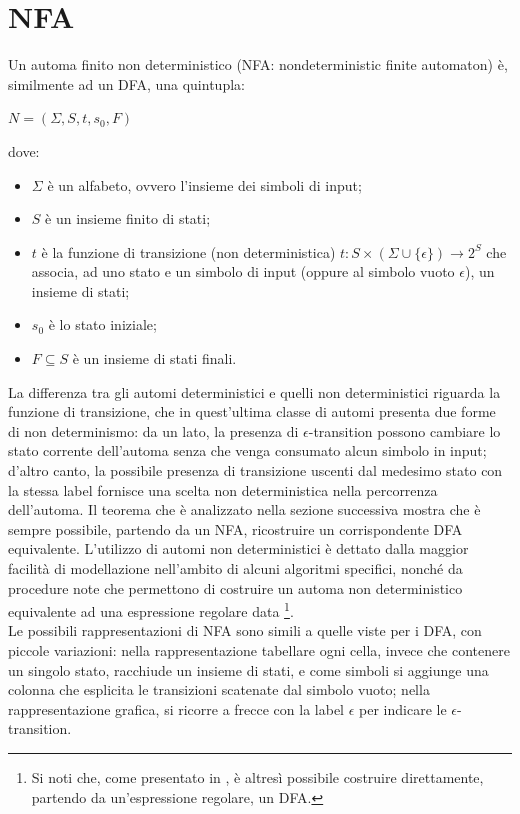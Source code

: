 \section{NFA}
Un automa finito non deterministico (NFA: nondeterministic finite automaton) è, similmente ad un DFA, una quintupla:
\begin{center}
	$N = (\Sigma,S,t,s_0,F)$
\end{center}
dove:
\begin{itemize}
\item $\Sigma$ è un alfabeto, ovvero l'insieme dei simboli di input;
\item $S$ è un insieme finito di stati;
\item $t$ è la funzione di transizione (non deterministica) $t: S \times (\Sigma \cup \{\epsilon\}) \rightarrow 2^S$ che associa, ad uno stato e un simbolo di input (oppure al simbolo vuoto $\epsilon$), un insieme di stati;
\item $s_0$ è lo stato iniziale;
\item $F \subseteq S$ è un insieme di stati finali.
\end{itemize}
La differenza tra gli automi deterministici e quelli non deterministici riguarda la funzione di transizione, che in quest'ultima classe di automi presenta due forme di non determinismo: da un lato, la presenza di $\epsilon$-transition possono cambiare lo stato corrente dell'automa senza che venga consumato alcun simbolo in input; d'altro canto, la possibile presenza di transizione uscenti dal medesimo stato con la stessa label fornisce una scelta non deterministica nella percorrenza dell'automa.
Il teorema che è analizzato nella sezione successiva mostra che è sempre possibile, partendo da un NFA, ricostruire un corrispondente DFA equivalente.
L'utilizzo di automi non deterministici è dettato dalla maggior facilità di modellazione nell'ambito di alcuni algoritmi specifici, nonché da procedure note che permettono di costruire un automa non deterministico equivalente ad una espressione regolare data \footnote{Si noti che, come presentato in \cite{book:compilers}, è altresì possibile costruire direttamente, partendo da un'espressione regolare, un DFA.}.\\
Le possibili rappresentazioni di NFA sono simili a quelle viste per i DFA, con piccole variazioni: nella rappresentazione tabellare ogni cella, invece che contenere un singolo stato, racchiude un insieme di stati, e come simboli si aggiunge una colonna che esplicita le transizioni scatenate dal simbolo vuoto; nella rappresentazione grafica, si ricorre a frecce con la label $\epsilon$ per indicare le $\epsilon$-transition.

